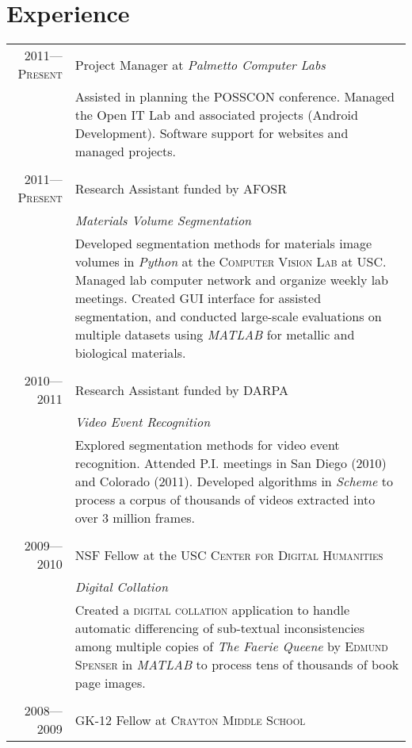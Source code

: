 \documentclass[a4paper,10pt]{article}
\begin{document}
\section{Experience}
\begin{longtable}{r|p{12cm}}
  \textsc{2011---Present}
  & Project Manager at \emph{Palmetto Computer Labs}\\
  &\footnotesize{Assisted in planning the POSSCON conference. Managed
    the Open IT Lab and associated projects (Android
    Development). Software support for websites and managed projects.}
  \\\multicolumn{2}{c}{} \\
  \textsc{2011---Present}
  & Research Assistant funded by \textsc{AFOSR} \\
  &\emph{Materials Volume Segmentation}\\
  &\footnotesize{Developed segmentation methods for materials image
    volumes in \emph{Python} at the \textsc{Computer Vision Lab} at
    \textsc{USC}. Managed lab computer network and organize weekly lab
    meetings.  Created GUI interface for assisted segmentation, and
    conducted large-scale evaluations on multiple datasets using
    \emph{MATLAB} for metallic and biological materials.}
  \\\multicolumn{2}{c}{} \\
  \textsc{2010---2011}
  & Research Assistant funded by \textsc{DARPA} \\
  &\emph{Video Event Recognition}\\
  &\footnotesize{Explored segmentation methods for video event
    recognition. Attended P.I. meetings in San Diego (2010) and
    Colorado (2011). Developed algorithms in \emph{Scheme} to process
    a corpus of thousands of videos extracted into over 3 million
    frames.}
  \\\multicolumn{2}{c}{} \\
  \textsc{2009---2010}
  & NSF Fellow at the \textsc{USC Center for Digital Humanities} \\
  &\emph{Digital Collation}\\
  &\footnotesize{Created a \textsc{digital collation} application to
    handle automatic differencing of sub-textual inconsistencies among
    multiple copies of \emph{The Faerie Queene} by \textsc{Edmund
      Spenser} in \emph{MATLAB} to process tens of thousands of book
    page images.}
  \\\multicolumn{2}{c}{} \\
  \textsc{2008---2009}
  & GK-12 Fellow at \textsc{Crayton Middle School} \\

\end{longtable}
\end{document}
